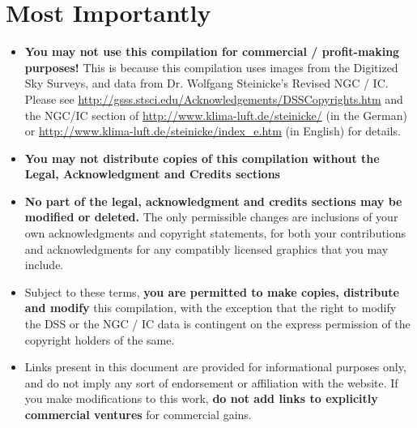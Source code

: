\section*{Most Importantly}
\begin{itemize}
\item \textbf{You may not use this compilation for commercial /
  profit-making purposes!}  This is because this compilation uses
  images from the Digitized Sky Surveys, and data from Dr. Wolfgang
  Steinicke's Revised NGC / IC. Please see
  \url{http://gsss.stsci.edu/Acknowledgements/DSSCopyrights.htm} and
  the NGC/IC section of \url{http://www.klima-luft.de/steinicke/} (in
  the German) or \url{http://www.klima-luft.de/steinicke/index_e.htm}
  (in English) for details.
\item \textbf{You may not distribute copies of this compilation
  without the Legal, Acknowledgment and Credits sections}
\item \textbf{No part of the legal, acknowledgment and credits
  sections may be modified or deleted.} The only permissible changes
  are inclusions of your own acknowledgments and copyright statements,
  for both your contributions and acknowledgments for any compatibly
  licensed graphics that you may include.
\item Subject to these terms, \textbf{you are permitted to make
  copies, distribute and modify} this compilation, with the exception
  that the right to modify the DSS or the NGC / IC data is contingent
  on the express permission of the copyright holders of the same.
\item Links present in this document are provided for informational
  purposes only, and do not imply any sort of endorsement or
  affiliation with the website. If you make modifications to this
  work, \textbf{do not add links to explicitly commercial ventures}
  for commercial gains.
\end{itemize}

